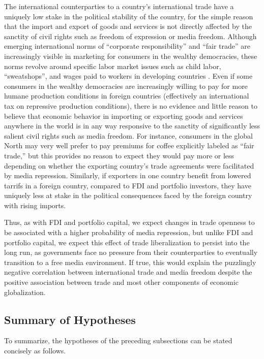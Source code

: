 \documentclass[a4paper]{article}\usepackage[]{graphicx}\usepackage[]{color}
\begin{document}
The international counterparties to a country's international trade have a uniquely low stake in the political stability of the country, for the simple reason that the import and export of goods and services is not directly affected by the sanctity of civil rights such as freedom of expression or media freedom. Although emerging international norms of “corporate responsibility” and “fair trade” are increasingly visible in marketing for consumers in the wealthy democracies, these norms revolve around specific labor market issues such as child labor, “sweatshops”, and wages paid to workers in developing countries \parencite{Moore:2004gy}. Even if some consumers in the wealthy democracies are increasingly willing to pay for more humane production conditions in foreign countries (effectively an international tax on repressive production conditions), there is no evidence and little reason to believe that economic behavior in importing or exporting goods and services anywhere in the world is in any way responsive to the sanctity of significantly less salient civil rights such as media freedom. For instance, consumers in the global North may very well prefer to pay premiums for coffee explicitly labeled as “fair trade,” but this provides no reason to expect they would pay more or less depending on whether the exporting country's trade agreements were facilitated by media repression. Similarly, if exporters in one country benefit from lowered tarrifs in a foreign country, compared to FDI and portfolio investors, they have uniquely less at stake in the political consequences faced by the foreign country with rising imports.

Thus, as with FDI and portfolio capital, we expect changes in trade openness to be associated with a higher probability of media repression, but unlike FDI and portfolio capital, we expect this effect of trade liberalization to persist into the long run, as governments face no pressure from their counterparties to eventually transition to a free media environment. If true, this would explain the puzzlingly negative correlation between international trade and media freedom despite the positive association between trade and most other components of economic globalization.

\subsection{Summary of Hypotheses}

To summarize, the hypotheses of the preceding subsections can be stated concisely as follows.
\end{document}
